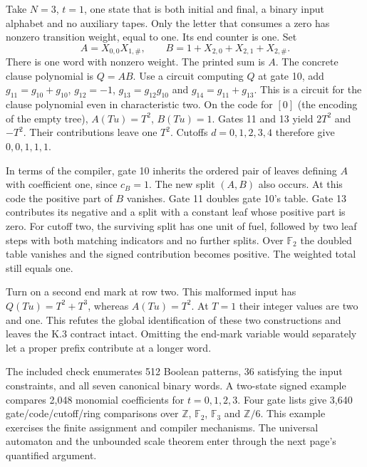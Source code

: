 \clearpage
{}

Take $N=3$, $t=1$, one state that is both initial and final, a binary input alphabet and no auxiliary tapes. Only the letter that consumes a zero has nonzero transition weight, equal to one. Its end counter is one. Set
\[
 A=X_{0,0}X_{1,\#},\qquad B=1+X_{2,0}+X_{2,1}+X_{2,\#}.
\]
There is one word with nonzero weight. The printed sum is $A$. The concrete clause polynomial is $Q=AB$. Use a circuit computing $Q$ at gate 10, add $g_{11}=g_{10}+g_{10}$, $g_{12}=-1$, $g_{13}=g_{12}g_{10}$ and $g_{14}=g_{11}+g_{13}$. This is a circuit for the clause polynomial even in characteristic two. On the code for $[0]$ (the encoding of the empty tree), $A(Tu)=T^2$, $B(Tu)=1$. Gates 11 and 13 yield $2T^2$ and $-T^2$. Their contributions leave one $T^2$. Cutoffs $d=0,1,2,3,4$ therefore give $0,0,1,1,1$.

In terms of the compiler, gate 10 inherits the ordered pair of leaves defining $A$ with coefficient one, since $c_B=1$. The new split $(A,B)$ also occurs. At this code the positive part of $B$ vanishes. Gate 11 doubles gate 10's table. Gate 13 contributes its negative and a split with a constant leaf whose positive part is zero. For cutoff two, the surviving split has one unit of fuel, followed by two leaf steps with both matching indicators and no further splits. Over $\mathbb F_2$ the doubled table vanishes and the signed contribution becomes positive. The weighted total still equals one.

Turn on a second end mark at row two. This malformed input has $Q(Tu)=T^2+T^3$, whereas $A(Tu)=T^2$. At $T=1$ their integer values are two and one. This refutes the global identification of these two constructions and leaves the K.3 contract intact. Omitting the end-mark variable would separately let a proper prefix contribute at a longer word.

The included check enumerates 512 Boolean patterns, 36 satisfying the input constraints, and all seven canonical binary words. A two-state signed example compares 2,048 monomial coefficients for $t=0,1,2,3$. Four gate lists give 3,640 gate/code/cutoff/ring comparisons over $\mathbb Z$, $\mathbb F_2$, $\mathbb F_3$ and $\mathbb Z/6$. This example exercises the finite assignment and compiler mechanisms. The universal automaton and the unbounded scale theorem enter through the next page's quantified argument.


